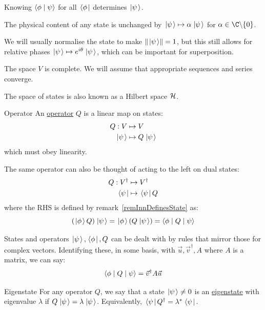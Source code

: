 \documentclass[../Main.tex]{subfiles}
\begin{document}
\begin{remarks}
    \item Knowing $\langle\phi\mid\psi\rangle$ for all $\left.\left\langle\phi\right.\right|$ determines $\left.\left|\psi\right.\right\rangle$. \label{remInnDefinesState}
    \item The physical content of any state is unchanged by $\left.\left|\psi\right.\right\rangle \mapsto \alpha \left.\left|\psi\right.\right\rangle$ for $\alpha \in \C \backslash \{0\}$.
    \item We will usually normalise the state to make $\left\|\left.\left|\psi\right.\right\rangle\right\| = 1$, but this still allows for relative phases $\left.\left|\psi\right.\right\rangle \mapsto e^{i\theta}\left.\left|\psi\right.\right\rangle$, which can be important for superposition.
    \item The space $V$ is complete. We will assume that appropriate sequences and series converge.
    \item The space of states is also known as a Hilbert space $\mathcal{H}$.
\end{remarks}
\begin{definition}{Operator}
    An \underline{operator} $Q$ is a linear map on states:
    \begin{align*}
        Q : V &\mapsto V\\
        \left.\left|\psi\right.\right\rangle &\mapsto Q\left.\left|\psi\right.\right\rangle
    \end{align*}
    which must obey linearity.
\end{definition}
The same operator can also be thought of acting to the left on dual states:
\begin{align*}
    Q : V^\dagger &\mapsto V^\dagger\\
    \left.\left\langle\psi\right.\right| &\mapsto \left.\left\langle\psi\right.\right|Q
\end{align*}
where the RHS is defined by remark~\ref{remInnDefinesState} as:
\begin{equation*}
    \left(\left.\left|\phi\right.\right\rangle Q\right)\left.\left|\psi\right.\right\rangle = \left.\left|\phi\right.\right\rangle \left(Q\left.\left|\psi\right.\right\rangle\right) = \langle\phi\mid Q\mid\psi\rangle
\end{equation*}
\begin{remark}
    States and operators $\left.\left|\psi\right.\right\rangle, \left.\left\langle\phi\right.\right|, Q$ can be dealt with by rules that mirror those for complex vectors. Identifying these, in some basis, with $\vec{u}, \vec{v}^\dagger, A$ where $A$ is a matrix, we can say:
    \begin{equation*}
        \langle\phi\mid Q\mid\psi\rangle = \vec{v}^\dagger A \vec{u}
    \end{equation*}
\end{remark}
\begin{definition}{Eigenstate}
    For any operator $Q$, we say that a state $\left.\left|\psi\right.\right\rangle \neq 0$ is an \underline{eigenstate} with eigenvalue $\lambda$ if $Q\left.\left|\psi\right.\right\rangle = \lambda\left.\left|\psi\right.\right\rangle$. Equivalently, $\left.\left\langle\psi\right.\right| Q^\dagger = \lambda^* \left.\left\langle\psi\right.\right|$.
\end{definition}
\end{document}
